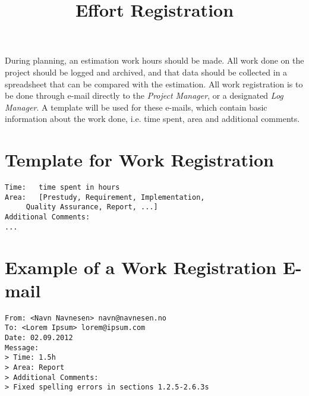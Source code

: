 \title{Effort Registration}
During planning, an estimation work hours should be made. 
All work done on the project should be logged and archived, 
and that data should be collected in a spreadsheet that can 
be compared with the estimation. All work registration is to 
be done through e-mail directly to the \emph{Project Manager}, 
or a designated \emph{Log Manager}. A template will be used for 
these e-mails, which contain basic information about the work done, 
i.e. time spent, area and additional comments.

\chapter*{Template for Work Registration}
\begin{lstlisting}
Time:	time spent in hours
Area:	[Prestudy, Requirement, Implementation, 
	 Quality Assurance, Report, ...]
Additional Comments:
...
\end{lstlisting}

\chapter*{Example of a Work Registration E-mail}
\begin{lstlisting}
From: <Navn Navnesen> navn@navnesen.no
To: <Lorem Ipsum> lorem@ipsum.com
Date: 02.09.2012
Message:
> Time: 1.5h
> Area: Report
> Additional Comments:
> Fixed spelling errors in sections 1.2.5-2.6.3s
\end{lstlisting}